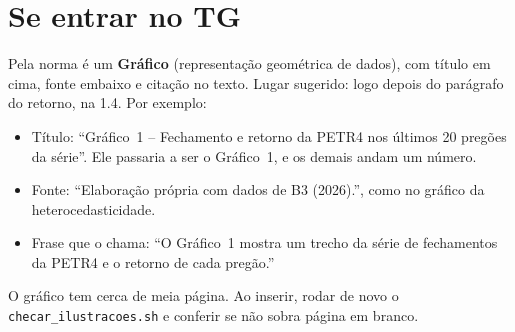 \documentclass[11pt,a4paper]{article}
\begin{document}
\section{Se entrar no TG}

Pela norma é um \textbf{Gráfico} (representação geométrica de dados), com título em
cima, fonte embaixo e citação no texto. Lugar sugerido: logo depois do parágrafo do
retorno, na 1.4. Por exemplo:

\begin{itemize}
\item Título: ``Gráfico~1 -- Fechamento e retorno da PETR4 nos últimos 20 pregões da
  série''. Ele passaria a ser o Gráfico~1, e os demais andam um número.
\item Fonte: ``Elaboração própria com dados de B3 (2026).'', como no gráfico da
  heterocedasticidade.
\item Frase que o chama: ``O Gráfico~1 mostra um trecho da série de fechamentos da
  PETR4 e o retorno de cada pregão.''
\end{itemize}

O gráfico tem cerca de meia página. Ao inserir, rodar de novo o
\texttt{checar\_ilustracoes.sh} e conferir se não sobra página em branco.
\end{document}
